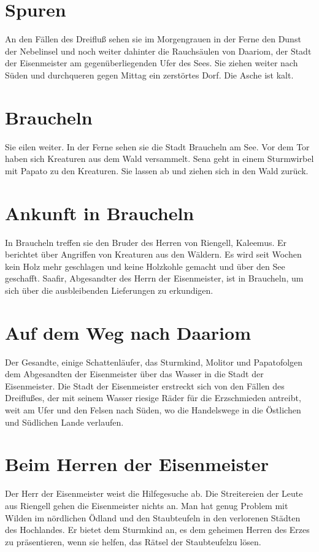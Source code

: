 \documentclass[12pt,a4paper,onecolumn,twoside,ngerman]{book}
\newcommand{\Molitor}{Molitor}
\newcommand{\Sena}{Sena}
\newcommand{\Sturmkind}{Sturmkind}
\newcommand{\Papato}{Papato}
\newcommand{\Schattenlaufer}{Schattenläufer}
\newcommand{\Rhingell}{Riengell}
\newcommand{\Kalemus}{Kaleemus}
\newcommand{\Dreifluss}{Dreifluß}
\newcommand{\Braucheln}{Braucheln}
\newcommand{\Eisenmeister}{Eisenmeister}
\newcommand{\Dariom}{Daariom}
\newcommand{\Safir}{Saafir}
\newcommand{\Staubteufel}{Staubteufel}
\begin{document}
\section{Spuren}
An den Fällen des {\Dreifluss} sehen sie im Morgengrauen in der Ferne den Dunst der Nebelinsel und noch weiter dahinter die Rauchsäulen von {\Dariom}, der Stadt der {\Eisenmeister} am gegenüberliegenden Ufer des Sees.\linebreak
Sie ziehen weiter nach Süden und durchqueren gegen Mittag ein zerstörtes Dorf. Die Asche ist kalt.

\section{\Braucheln}
Sie eilen weiter. In der Ferne sehen sie die Stadt {\Braucheln} am See. Vor dem Tor haben sich Kreaturen aus dem Wald versammelt. {\Sena} geht in einem Sturmwirbel mit {\Papato} zu den Kreaturen. Sie lassen ab und ziehen sich in den Wald zurück.

\section{Ankunft in {\Braucheln}}
In {\Braucheln} treffen sie den Bruder des Herren von {\Rhingell}, {\Kalemus}. Er berichtet über Angriffen von Kreaturen aus den Wäldern. Es wird seit Wochen kein Holz mehr geschlagen und keine Holzkohle gemacht und über den See geschafft. {\Safir}, Abgesandter des Herrn der {\Eisenmeister}, ist in {\Braucheln}, um sich über die ausbleibenden Lieferungen zu erkundigen.

\section{Auf dem Weg nach \Dariom}
Der Gesandte, einige {\Schattenlaufer}, das {\Sturmkind}, {\Molitor} und \Papato folgen dem Abgesandten der {\Eisenmeister} über das Wasser in die Stadt der {\Eisenmeister}.\linebreak
Die Stadt der {\Eisenmeister} erstreckt sich von den Fällen des {\Dreifluss}es, der mit seinem Wasser riesige Räder für die Erzschmieden antreibt, weit am Ufer und den Felsen nach Süden, wo die Handelswege in die Östlichen und Südlichen Lande verlaufen.

\section{Beim Herren der {\Eisenmeister}}
Der Herr der {\Eisenmeister} weist die Hilfegesuche ab. Die Streitereien der Leute aus {\Rhingell}  gehen die {\Eisenmeister} nichts an. Man hat genug Problem mit Wilden im nördlichen Ödland und den {\Staubteufel}n in den verlorenen Städten des Hochlandes.\linebreak 
Er bietet dem {\Sturmkind} an, es dem geheimen Herren des Erzes zu präsentieren, wenn sie helfen, das Rätsel der \Staubteufel zu lösen.
\end{document}
